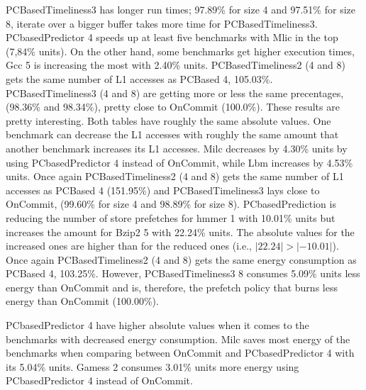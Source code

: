 PCBasedTimeliness3 has longer run times; 97.89\% for size 4 and 97.51\% for size 8,
iterate over a bigger buffer takes more time for PCBasedTimeliness3.
PCbasedPredictor 4 speeds up at least five benchmarks with Mlic in the top (7,84\%
units). On the other hand, some benchmarks get higher execution times, Gcc 5 is
increasing the most with 2.40\% units.
\resAcc
{}
PCBasedTimeliness2 (4 and 8) gets the same number of L1 accesses as PCBased 4, 105.03\%. PCBasedTimeliness3 (4 and 8) are getting more or less the same precentages, (98.36\% and 98.34\%), pretty close to OnCommit (100.0\%).
 These results are pretty interesting. Both tables have roughly the same absolute
values. One benchmark can decrease the L1 accesses with roughly the same amount that
another benchmark increases its L1 accesses. Milc decreases by 4.30\% units by
using PCbasedPredictor 4 instead of OnCommit, while Lbm increases by 4.53\% units.
\resSp
{}
Once again PCBasedTimeliness2 (4 and 8) gets the same number of L1 accesses as PCBased 4 (151.95\%) and PCBasedTimeliness3 lays close to OnCommit, (99.60\% for size 4 and 98.89\% for size 8).
PCbasedPrediction is reducing the number of store prefetches for hmmer 1 with
10.01\% units but increases the amount for Bzip2 5 with 22.24\% units. The absolute values for the increased ones are higher than for the reduced ones (i.e., $|22.24| > | - 10.01|$).
\resEnergy
{}
Once again PCBasedTimeliness2 (4 and 8) gets the same energy consumption as
PCBased 4, 103.25\%. However, PCBasedTimeliness3 8 consumes 5.09\% units less
energy than OnCommit and is, therefore, the prefetch policy that burns less energy than OnCommit (100.00\%).
  
PCbasedPredictor 4 have higher absolute values when it comes to the benchmarks with decreased energy consumption. Milc saves most energy of the benchmarks when comparing between OnCommit and PCbasedPredictor 4 with its 5.04\% units.
Gamess 2 consumes 3.01\% units more energy using PCbasedPredictor 4 instead of
OnCommit.

